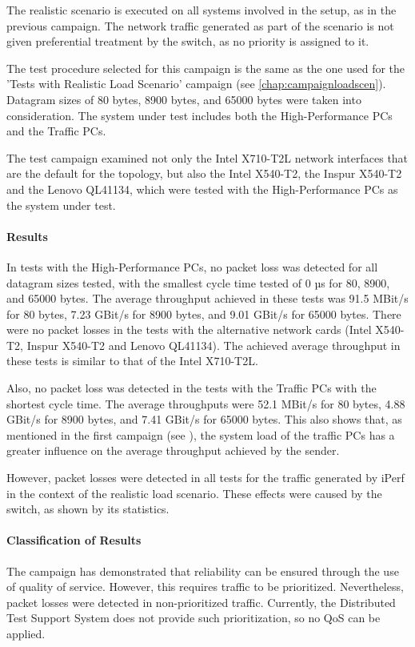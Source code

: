 The realistic scenario is executed on all systems involved in the setup, as in the previous campaign. The network traffic generated as part of the scenario is not given preferential treatment by the switch, as no priority is assigned to it.

The test procedure selected for this campaign is the same as the one used for the 'Tests with Realistic Load Scenario' campaign (see \ref{chap:campaignloadscen}). Datagram sizes of 80 bytes, 8900 bytes, and 65000 bytes were taken into consideration. The system under test includes both the High-Performance PCs and the Traffic PCs.

The test campaign examined not only the Intel X710-T2L network interfaces that are the default for the topology, but also the Intel X540-T2, the Inspur X540-T2 and the Lenovo QL41134, which were tested with the High-Performance PCs as the system under test.

\paragraph{Results}
In tests with the High-Performance PCs, no packet loss was detected for all datagram sizes tested, with the smallest cycle time tested of 0 µs for 80, 8900, and 65000 bytes. The average throughput achieved in these tests was 91.5 MBit/s for 80 bytes, 7.23 GBit/s for 8900 bytes, and 9.01 GBit/s for 65000 bytes. There were no packet losses in the tests with the alternative network cards (Intel X540-T2, Inspur X540-T2 and Lenovo QL41134). The achieved average throughput in these tests is similar to that of the Intel X710-T2L.

Also, no packet loss was detected in the tests with the Traffic PCs with the shortest cycle time. The average throughputs were 52.1 MBit/s for 80 bytes, 4.88 GBit/s for 8900 bytes, and 7.41 GBit/s for 65000 bytes. This also shows that, as mentioned in the first campaign (see \label{chap:relcamp1}), the system load of the traffic PCs has a greater influence on the average throughput achieved by the sender.

However, packet losses were detected in all tests for the traffic generated by iPerf in the context of the realistic load scenario. These effects were caused by the switch, as shown by its statistics.

\paragraph{Classification of Results}
The campaign has demonstrated that reliability can be ensured through the use of quality of service. However, this requires traffic to be prioritized. Nevertheless, packet losses were detected in non-prioritized traffic. Currently, the Distributed Test Support System does not provide such prioritization, so no QoS can be applied.

